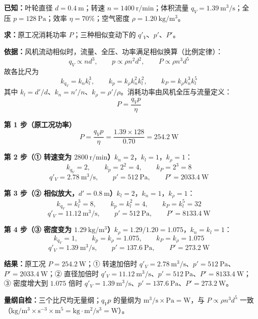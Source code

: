 \begin{jie}
\textbf{已知：}叶轮直径 $d=0.4\ \mathrm{m}$；转速 $n=1400\ \mathrm{r/min}$；体积流量 $q_V=1.39\ \mathrm{m^3/s}$；全压 $p=128\ \mathrm{Pa}$；效率 $\eta=70\%$；空气密度 $\rho=1.20\ \mathrm{kg/m^3}$。

\textbf{求：}原工况消耗功率 $P$；三种相似变动下的 $q'_V$、$p'$、$P'$。

\textbf{依据：}风机流动相似时，流量、全压、功率满足相似换算（比例定律）：
\[q_V\propto nd^{3},\qquad p\propto\rho n^{2}d^{2},\qquad P\propto\rho n^{3}d^{5}\]
故各比尺为
\[k_{q_V}=k_nk_l^{3},\qquad k_p=k_\rho k_n^{2}k_l^{2},\qquad k_P=k_\rho k_n^{3}k_l^{5}\]
其中 $k_l=d'/d$、$k_n=n'/n$、$k_\rho=\rho'/\rho$。消耗功率由风机全压与流量定义：
\[P=\frac{q_Vp}{\eta}\]

\textbf{第 1 步（原工况功率）}\quad
\[P=\frac{q_Vp}{\eta}=\frac{1.39\times128}{0.70}=254.2\ \mathrm{W}\]

\textbf{第 2 步（① 转速变为 $2800\ \mathrm{r/min}$）}\quad $k_n=2$，$k_l=1$，$k_\rho=1$：
\[k_{q_V}=2,\qquad k_p=2^{2}=4,\qquad k_P=2^{3}=8\]
\[q'_V=2.78\ \mathrm{m^3/s},\qquad p'=512\ \mathrm{Pa},\qquad P'=2033.4\ \mathrm{W}\]

\textbf{第 3 步（② 相似放大，$d'=0.8\ \mathrm{m}$）}\quad $k_l=2$，$k_n=1$，$k_\rho=1$：
\[k_{q_V}=k_l^{3}=8,\qquad k_p=k_l^{2}=4,\qquad k_P=k_l^{5}=32\]
\[q'_V=11.12\ \mathrm{m^3/s},\qquad p'=512\ \mathrm{Pa},\qquad P'=8133.4\ \mathrm{W}\]

\textbf{第 4 步（③ 密度变为 $1.29\ \mathrm{kg/m^3}$）}\quad $k_\rho=1.29/1.20=1.075$，$k_n=k_l=1$：
\[k_{q_V}=1,\qquad k_p=k_\rho=1.075,\qquad k_P=k_\rho=1.075\]
\[q'_V=1.39\ \mathrm{m^3/s},\qquad p'=137.6\ \mathrm{Pa},\qquad P'=273.2\ \mathrm{W}\]

\textbf{结果：}原工况 $P=254.2\ \mathrm{W}$；① 转速加倍时 $q'_V=2.78\ \mathrm{m^3/s}$、$p'=512\ \mathrm{Pa}$、$P'=2033.4\ \mathrm{W}$；② 直径加倍时 $q'_V=11.12\ \mathrm{m^3/s}$、$p'=512\ \mathrm{Pa}$、$P'=8133.4\ \mathrm{W}$；③ 密度增大到 $1.075$ 倍时 $q'_V=1.39\ \mathrm{m^3/s}$、$p'=137.6\ \mathrm{Pa}$、$P'=273.2\ \mathrm{W}$。

\textbf{量纲自检：}三个比尺均无量纲；$q_Vp$ 的量纲为 $\mathrm{m^3/s}\times\mathrm{Pa}=\mathrm{W}$，与 $P\propto\rho n^{3}d^{5}$ 一致（$\mathrm{kg/m^3}\times\mathrm{s^{-3}}\times\mathrm{m^{5}}=\mathrm{kg\cdot m^{2}/s^{3}}=\mathrm{W}$）。
\end{jie}

